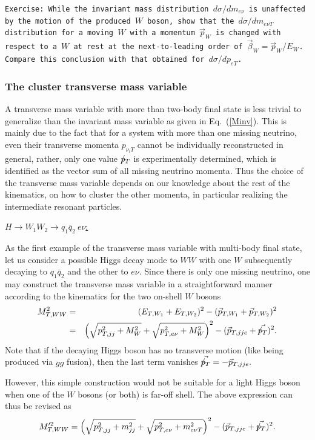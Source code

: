 \documentclass[12pt,prd,aps,floats,preprintnumbers,preprint,superscriptaddress,floatfix,nofootinbib]{revtex4}
\newcommand{ \slashchar }[1]{\setbox0=\hbox{$#1$}   %
   \dimen0=\wd0                                     %
   \setbox1=\hbox{/} \dimen1=\wd1                   %
   \ifdim\dimen0>\dimen1                            %
      \rlap{\hbox to \dimen0{\hfil/\hfil}}          %
      #1                                            %
   \else                                            %
      \rlap{\hbox to \dimen1{\hfil$#1$\hfil}}       %
      /                                             %
   \fi}                                             %
\def\ptmiss{\slashchar{p}_{T}}
\def\bea{\begin{eqnarray}}
\def\eea{\end{eqnarray}}
\begin{document}
{
\vskip 0.2cm
\noindent
\tt Exercise: While the invariant mass distribution $d\sigma/dm_{e\nu}$ is unaffected 
 by the motion of the produced $W$ boson, show that the $d\sigma/ dm_{e\nu T}^{}$ 
 distribution for a moving $W$ with a momentum $\vec p_W^{}$ is changed with 
 respect to a $W$ at rest  at the next-to-leading order of $\vec \beta_W^{} = \vec p_W^{}/E_W$.
Compare this conclusion with that obtained for  $d\sigma/ dp_{eT}^{}$.
\vskip 0.2cm
}

\subsubsection{The cluster transverse mass variable}

A  transverse mass variable with more than two-body final state is
less trivial to generalize than the invariant mass variable 
as given in Eq.~(\ref{Minv}).  This is mainly due to the fact that for a system
with more than one missing neutrino, even their transverse 
momenta $p_{\nu_i T}$
cannot be  individually reconstructed in general,  rather,  only one value
$\ptmiss$ is experimentally determined, which is identified as the vector
sum of all missing neutrino momenta.  Thus the choice of the
transverse mass variable depends on our knowledge about
the rest of the kinematics, on how to cluster the other momenta, 
in particular realizing the intermediate resonant particles. 

\vskip 0.2cm
\noindent
\underline{$H\to W_1 W_2 \to q_1 \bar q_2\ e \nu$:}

As the first example of the transverse mass variable with multi-body
final state, let us consider a possible Higgs decay mode
to $WW$ with one $W$ subsequently decaying to $q_1 \bar q_2$ 
and the other to $e\nu$. Since there is only one missing neutrino,
one may construct the transverse mass variable in a straightforward 
manner according to the kinematics for the two on-shell $W$ bosons
%
\bea
\nonumber
 M_{T,WW}^2 &=&  (E_{T,W_1} + E_{T,W_2} )^2 - (\vec p_{T,W_1} + \vec p_{T,W_2} )^2 \\
&=& \left( \sqrt{p_{T,jj}^2 + M_W^2} + \sqrt{p_{T,e\nu}^2 + M_W^2}  \right)^2 
- (\vec p_{T,jje} + \vec{\ptmiss } )^2.
\nonumber
\eea
Note that if the decaying Higgs boson has no transverse motion (like being
produced via $gg$ fusion), then the last term vanishes $\vec{\ptmiss }=-\vec p_{T,jje}.$

However, this simple construction would not be suitable for a light Higgs boson
when one of the $W$ bosons (or both) is far-off shell. 
The above expression can thus be revised as 
\bea
 M_{T,WW}^{\prime 2} 
 = \left( \sqrt{p_{T,jj}^2 + m_{jj}^2} + \sqrt{p_{T,e\nu}^2 + m_{e\nu T}^2}  \right)^2 
- (\vec p_{T,jje} + \vec{\ptmiss } )^2.
\nonumber
\eea
\end{document}
